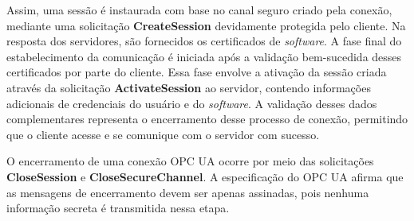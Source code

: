         Assim, uma sessão é instaurada com base no canal seguro criado pela conexão, mediante uma solicitação \textbf{CreateSession} devidamente protegida pelo cliente. Na resposta dos servidores, são fornecidos os certificados de \textit{software}. A fase final do estabelecimento da comunicação é iniciada após a validação bem-sucedida desses certificados por parte do cliente. Essa fase envolve a ativação da sessão criada através da solicitação \textbf{ActivateSession} ao servidor, contendo informações adicionais de credenciais do usuário e do \textit{software}. A validação desses dados complementares representa o encerramento desse processo de conexão, permitindo que o cliente acesse e se comunique com o servidor com sucesso.

        O encerramento de uma conexão OPC UA ocorre por meio das solicitações \textbf{CloseSession} e \textbf{CloseSecureChannel}. A especificação do OPC UA \cite{opc2022} afirma que as mensagens de encerramento devem ser apenas assinadas, pois nenhuma informação secreta é transmitida nessa etapa.


